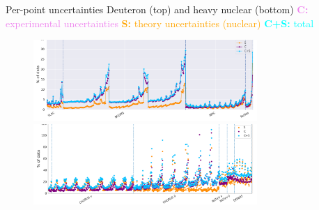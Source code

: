 \begin{frame}{Per-point uncertainties}
\footnotesize{Deuteron (top) and heavy nuclear (bottom) }
\newline
\footnotesize{\textcolor{violet}{{\bf C:} experimental uncertainties}}
\newline
\footnotesize{\textcolor{orange}{{\bf S:} theory uncertainties (nuclear)}}
\newline
\footnotesize{\textcolor{cyan}{{\bf C+S:} total}}
  \begin{figure}
    \includegraphics[width=85mm]{nuclear_uncs/diagdeut.png}
    \includegraphics[width=85mm]{nuclear_uncs/diagnuc.png}
  \end{figure}
\end{frame}
